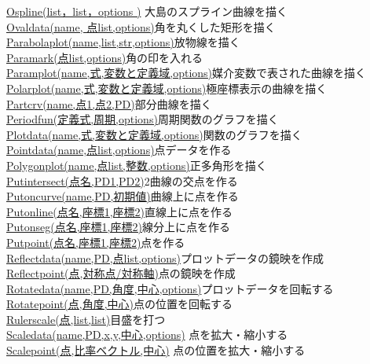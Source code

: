 \documentclass[papersize,a4paper,12pt,uplatex]{jsarticle}
\begin{document}
\begin{tabbing}
\hyperlink{ospline}{Ospline(list，list，options )} \>大島のスプライン曲線を描く\\
\hyperlink{ovaldata}{Ovaldata(name, 点list,options)}\>角を丸くした矩形を描く\\
\hyperlink{parabolaplot}{Parabolaplot(name,list,str,options)}\>放物線を描く\\
\hyperlink{paramark}{Paramark(点list,options)}\>角の印を入れる\\
\hyperlink{paramplot}{Paramplot(name,式,変数と定義域,options)}\>媒介変数で表された曲線を描く\\
\hyperlink{polarplot}{Polarplot(name,式,変数と定義域,options)}\>極座標表示の曲線を描く\\\hyperlink{partcrv}{Partcrv(name,点1,点2,PD)}\>部分曲線を描く\\
\hyperlink{periodfun}{Periodfun(定義式,周期,options)}\>周期関数のグラフを描く\\
\hyperlink{plotdata}{Plotdata(name,式,変数と定義域,options)}\>関数のグラフを描く\\
\hyperlink{pointdata}{Pointdata(name,点list,options)}\>点データを作る\\
\hyperlink{polygonplot}{Polygonplot(name,点list,整数,options)}\>正多角形を描く\\
\hyperlink{putintersect}{Putintersect(点名,PD1,PD2)}\>2曲線の交点を作る\\
\hyperlink{putoncurve}{Putoncurve(name,PD,初期値)}\>曲線上に点を作る\\
\hyperlink{putonline}{Putonline(点名,座標1,座標2)}\>直線上に点を作る\\
\hyperlink{putonseg}{Putonseg(点名,座標1,座標2)}\>線分上に点を作る\\
\hyperlink{putpoint}{Putpoint(点名,座標1,座標2)}\>点を作る\\
\hyperlink{reflectdata}{Reflectdata(name,PD,点list,options)}\>プロットデータの鏡映を作成\\
\hyperlink{reflectpoint}{Reflectpoint(点,対称点/対称軸)}\>点の鏡映を作成\\
\hyperlink{rotatedata}{Rotatedata(name,PD,角度,中心,options)}\>プロットデータを回転する\\
\hyperlink{rotatepoint}{Rotatepoint(点,角度,中心)}\>点の位置を回転する\\
\hyperlink{rulerscale}{Rulerscale(点,list,list)}\>目盛を打つ\\
\hyperlink{scaledata}{Scaledata(name,PD,x,y,中心,options)} \>点を拡大・縮小する\\
\hyperlink{scalepoint}{Scalepoint(点,比率ベクトル,中心)} \>点の位置を拡大・縮小する\\

\end{tabbing}
\end{document}
